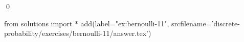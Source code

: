 
\begin{ex} 
  \label{ex:bernoulli-11}
  
  \qed
\end{ex} 
\begin{python0}
from solutions import *
add(label="ex:bernoulli-11",
    srcfilename='discrete-probability/exercises/bernoulli-11/answer.tex') 
\end{python0}
